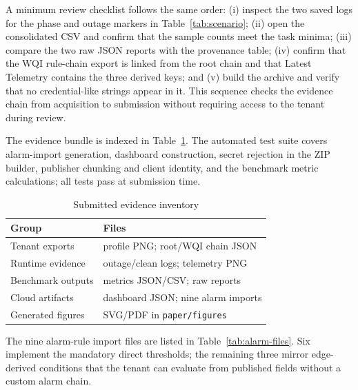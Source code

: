 \documentclass[conference]{IEEEtran}
\begin{document}
A minimum review checklist follows the same order: (i) inspect the two saved
logs for the phase and outage markers in Table~\ref{tab:scenario}; (ii) open the
consolidated CSV and confirm that the sample counts meet the task minima;
(iii) compare the two raw JSON reports with the provenance table; (iv) confirm
that the WQI rule-chain export is linked from the root chain and that Latest
Telemetry contains the three derived keys; and (v) build the archive and verify
that no credential-like strings appear in it. This sequence checks the evidence
chain from acquisition to submission without requiring access to the tenant
during review.

The evidence bundle is indexed in Table~\ref{tab:inventory}. The automated test
suite covers alarm-import generation, dashboard construction, secret rejection
in the ZIP builder, publisher chunking and client identity, and the benchmark
metric calculations; all tests pass at submission time.

\begin{table}[t]
\caption{Submitted evidence inventory}
\label{tab:inventory}
\centering
\scriptsize
\begin{tabular}{@{}ll@{}}
\toprule
Group & Files \\
\midrule
Tenant exports & profile PNG; root/WQI chain JSON \\
Runtime evidence & outage/clean logs; telemetry PNG \\
Benchmark outputs & metrics JSON/CSV; raw reports \\
Cloud artifacts & dashboard JSON; nine alarm imports \\
Generated figures & SVG/PDF in \texttt{paper/figures} \\
\bottomrule
\end{tabular}
\end{table}

The nine alarm-rule import files are listed in
Table~\ref{tab:alarm-files}. Six implement the mandatory direct thresholds; the
remaining three mirror edge-derived conditions that the tenant can evaluate
from published fields without a custom alarm chain.
\end{document}
